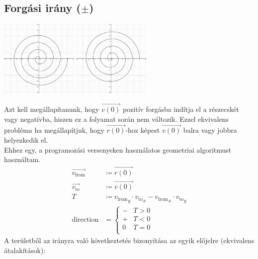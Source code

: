 \documentclass[a4paper]{article}
\begin{document}
\begin{multicols}{2}
	\subsection{Forgási irány ($\pm$)}
		\newcommand{\vecFrom}[0]{v_{\mathrm{from}}}
		\newcommand{\vecTo}[0]{v_{\mathrm{to}}}
		\begin{center}
			\includegraphics[height=10em]{graphics/parametric base.png}
			\quad
			\includegraphics[height=10em]{graphics/parametric direction.png}
		\end{center}
		Azt kell megállapítanunk, hogy $\vec{v(0)}$ pozitív forgásba indítja el a részecskét vagy negatívba, hiszen ez a folyamat során nem változik. Ezzel ekvivalens probléma ha megállapítjuk, hogy $\vec{r(0)}$-hoz képest $\vec{v(0)}$ balra vagy jobbra helyezkedik el. \\
		Ehhez egy, a programozási versenyeken használatos geometriai algoritmust használtam. \\
		\begin{align*}
			\vec{\vecFrom} &\coloneqq \vec{r(0)} \\
			\vec{\vecTo} &\coloneqq \vec{v(0)} \\
			T &\coloneqq {\vecFrom}_y \cdot {\vecTo}_x - {\vecFrom}_x \cdot {\vecTo}_y \\
			\mathrm{direction} &= \left\{
				\begin{array}{rl}
					- & T > 0 \\
					+ & T < 0 \\
					0 & T = 0 \\
				\end{array}
			\right.
		\end{align*}
		A területből az irányra való következtetés bizonyítása az egyik előjelre (ekvivalens átalakítások):\\

\end{multicols}
\end{document}
